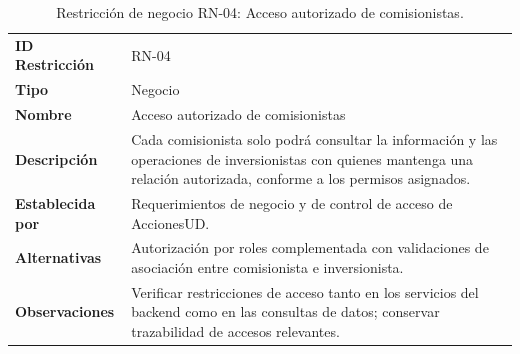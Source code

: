 \documentclass[11pt,a4paper,oneside]{article}
\begin{document}
\begingroup
\small
\setlength{\tabcolsep}{7pt}
\renewcommand{\arraystretch}{1.30}
\setlength{\anchoRegistro}{\dimexpr\textwidth-4\tabcolsep-3\arrayrulewidth\relax}
\begin{table}[H]
\centering
\caption{Restricción de negocio RN-04: Acceso autorizado de comisionistas.}
\label{tab:restriccion-rn-04}
\begin{tabular}{|
>{\RaggedRight\arraybackslash}p{.28\anchoRegistro}|
>{\RaggedRight\arraybackslash}p{.72\anchoRegistro}|}
\hline
\rowcolor{negroTabla}
\multicolumn{2}{|l|}{\color{white}\bfseries Registro de Restricción de Negocio}\\\hline
\cellcolor{azulTabla}\bfseries ID Restricción
& RN-04\\\hline
\cellcolor{azulTabla}\bfseries Tipo
& Negocio\\\hline
\cellcolor{azulTabla}\bfseries Nombre
& Acceso autorizado de comisionistas\\\hline
\cellcolor{azulTabla}\bfseries Descripción
& Cada comisionista solo podrá consultar la información y las operaciones de inversionistas con quienes mantenga una relación autorizada, conforme a los permisos asignados.\\\hline
\cellcolor{azulTabla}\bfseries Establecida por
& Requerimientos de negocio y de control de acceso de AccionesUD.\\\hline
\cellcolor{azulTabla}\bfseries Alternativas
& Autorización por roles complementada con validaciones de asociación entre comisionista e inversionista.\\\hline
\cellcolor{azulTabla}\bfseries Observaciones
& Verificar restricciones de acceso tanto en los servicios del backend como en las consultas de datos; conservar trazabilidad de accesos relevantes.\\\hline
\end{tabular}
\end{table}
\endgroup
\end{document}
